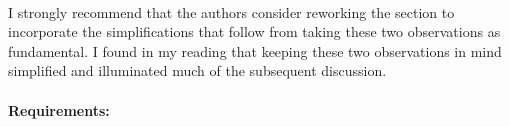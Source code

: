 \begin{enumerate}
~

  I strongly recommend that the authors consider reworking the section to incorporate the simplifications that follow from taking these two observations as fundamental. I found in my reading that keeping these two observations in mind simplified and illuminated much of the subsequent discussion.



\end{enumerate}

\paragraph{Requirements:}
